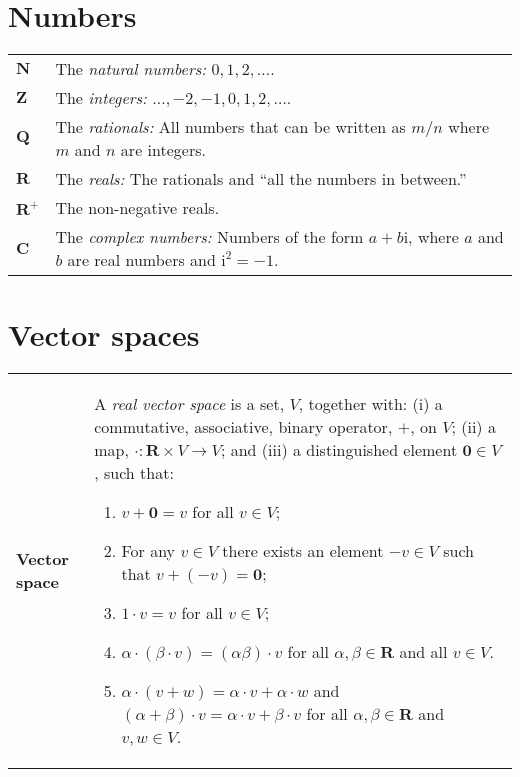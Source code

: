 \documentclass[10pt, a4paper, landscape]{article}
\newcommand{\defn}[1]{\textbf{#1}}
\newcommand{\set}[1]{\mathbold{#1}}
\newcommand{\imag}{\mathrm{i}}
\begin{document}
\begin{multicols*}{3}
\section*{Numbers}
\begin{tabularx}{\columnwidth}{@{}l>{\raggedright\arraybackslash}X@{}}
  \toprule
  $\set{N}$ & The \emph{natural numbers:} $0, 1, 2, \dotsc$. \\
  $\set{Z}$ & The \emph{integers:} $\dotsc, -2, -1, 0, 1, 2, \dotsc$. \\
  $\set{Q}$ & The \emph{rationals:} All numbers that can be written
  as $m/n$ where $m$ and $n$ are integers. \\
  $\set{R}$ & The \emph{reals:} The rationals and ``all the numbers in
  between.'' \\
  $\set{R}^+$ & The non-negative reals. \\
  $\set{C}$ & The \emph{complex numbers:} Numbers of the form $a + b\imag$, where $a$ and $b$ are real numbers and $\imag^2=-1$. 
\end{tabularx}


\section*{Vector spaces}
\begin{tabularx}{\columnwidth}{@{}l>{\raggedright\arraybackslash}X@{}}
  \toprule \defn{Vector space} & A \emph{real vector space} is a set,
  $V$, together with: (i) a commutative, associative, binary operator,
  $+$, on $V$; (ii) a map, $\cdot\colon \set{R}\times V\to V$; and (iii) a
  distinguished element $\mathbold{0}\in V$, such that:
  \begin{enumerate}
  \item $v + \mathbold{0} = v$ for all $v\in V$;
  \item For any $v\in V$ there exists an element $-v \in V$ such that $v+(-v)=\mathbold{0}$;
  \item $1 \cdot v = v$ for all $v\in V$;
  \item $\alpha\cdot(\beta\cdot v) = (\alpha\beta)\cdot v$ for all $\alpha,\beta\in \set{R}$ and all $v\in V$.
  \item $\alpha\cdot(v+w) = \alpha\cdot v+ \alpha\cdot w$ and $(\alpha+\beta)\cdot v = \alpha\cdot v + \beta \cdot v$ for all $\alpha, \beta\in \set{R}$ and $v,w \in V$.
  \end{enumerate}


\end{tabularx}
\end{multicols*}
\end{document}
